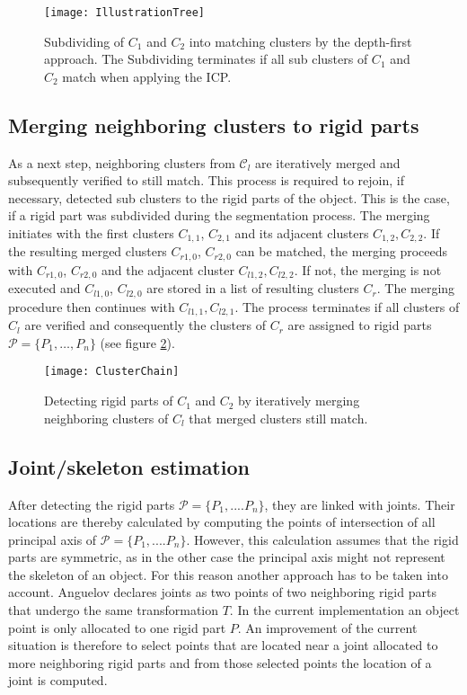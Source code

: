 \begin{figure}
	\centering
	\texttt{[image: IllustrationTree]}
	\caption{Subdividing of $C_1$ and $C_2$ into matching clusters by the depth-first approach. The Subdividing terminates if all sub clusters of $C_1$ and $C_2$ match when applying the ICP.}
	\label{fig:illustrationTree}
\end{figure}

\subsection{Merging neighboring clusters to rigid parts}
As a next step, neighboring clusters from $\mathcal{C}_l$ are iteratively merged and subsequently verified to still match. This process is required to rejoin, if necessary, detected sub clusters to the rigid parts of the object. This is the case, if a rigid part was subdivided during the segmentation process. The merging initiates with the first clusters $C_{1,1}$, $C_{2,1}$ and its adjacent clusters $C_{1,2},C_{2,2}$. If the resulting merged clusters $C_{r1,0}$, $C_{r2,0}$ can be matched, the merging proceeds with $C_{r1,0}$, $C_{r2,0}$ and the adjacent cluster $C_{l1,2},C_{l2,2}$. If not, the merging is not executed and $C_{l1,0}$, $C_{l2,0}$ are stored in a list of resulting clusters $C_r$. The merging procedure then continues with $C_{l1,1},C_{l2,1}$. The process terminates if all clusters of $C_l$ are verified and consequently the clusters of $C_r$ are assigned to rigid parts $ \mathcal{P} =  \{P_1,\ldots,P_n\}$ (see figure \ref{fig:clusterChain}). 

\begin{figure}
	\centering
	\texttt{[image: ClusterChain]}
	\caption{Detecting rigid parts of $C_1$ and $C_2$ by iteratively merging neighboring clusters of $C_l$ that merged clusters still match.}
	\label{fig:clusterChain}
\end{figure}

\subsection{Joint/skeleton estimation}

After detecting the rigid parts $\mathcal{P} =  \{ {P_1,....P_n}\}$, they are linked with joints. Their locations are thereby calculated by computing the points of intersection of all principal axis of $\mathcal{P} =  \{ {P_1,....P_n}\}$. However, this calculation assumes that the rigid parts are symmetric, as in the other case the principal axis might not represent the skeleton of an object. For this reason another approach has to be taken into account. Anguelov \cite{Anguelov04} declares joints as two points of two neighboring rigid parts that undergo the same transformation $T$. In the current implementation an object point is only allocated to one rigid part $P$. An improvement of the current situation is therefore to select points that are located near a joint allocated to more neighboring rigid parts and from those selected points the location of a joint is computed. 

